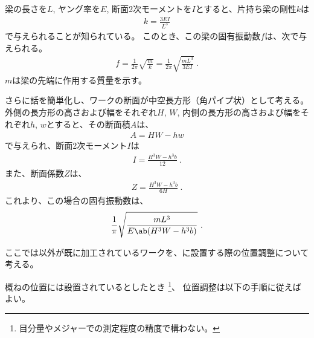 梁の長さを$L$, ヤング率を$E$, 断面2次モーメントを$I$とすると、片持ち梁の剛性$k$は
\begin{align*}
  k = \frac{3EI}{L^3}
\end{align*}
で与えられることが知られている。
このとき、この梁の固有振動数$f$は、次で与えられる。
\begin{align*}
  f = \frac1{2\pi}\sqrt{\frac mk}
    = \frac1{2\pi}\sqrt{\frac{mL^3}{3EI}}\ .
\end{align*}
$m$は梁の先端に作用する質量を示す。

さらに話を簡単化し、ワークの断面が中空長方形（角パイプ状）として考える。
外側の長方形の高さおよび幅をそれぞれ$H$, $W$, 内側の長方形の高さおよび幅をそれぞれ$h$, $w$とすると、その断面積$A$は、
\begin{align*}
  A = HW-hw
\end{align*}
で与えられ、断面2次モーメント$I$は
\begin{align*}
  I = \frac{H^3W-h^3b}{12}\ .
\end{align*}
また、断面係数$Z$は、
\begin{align*}
  Z = \frac{H^3W-h^3b}{6H}\ .
\end{align*}
これより、この場合の固有振動数は、
\begin{align*}
  \frac1\pi\sqrt{\frac{mL^3}{E\ab(H^3W-h^3b)}}\ .
\end{align*}



\clearpage
ここでは\Dimple 以外が既に加工されているワークを、\DMC に設置する際の位置調整について考える。

概ねの位置には設置されているとしたとき
\footnote{目分量やメジャーでの測定程度の精度で構わない。}、
位置調整は以下の手順に従えばよい。

